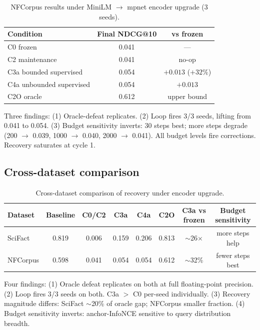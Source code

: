 \documentclass[12pt]{article}
\begin{document}
\begin{table}[ht]
\centering
\caption{NFCorpus results under MiniLM $\to$ mpnet encoder upgrade (3 seeds).}
\label{tab:nfcorpus}
\begin{tabular}{lcc}
\toprule
\textbf{Condition} & \textbf{Final NDCG@10} & \textbf{vs frozen} \\
\midrule
C0 frozen & 0.041 & --- \\
C2 maintenance & 0.041 & no-op \\
C3a bounded supervised & 0.054 & $+0.013$ ($+32\%$) \\
C4a unbounded supervised & 0.054 & $+0.013$ \\
C2O oracle & 0.612 & upper bound \\
\bottomrule
\end{tabular}
\end{table}

Three findings: (1) Oracle-defeat replicates. (2) Loop fires 3/3 seeds, lifting from 0.041 to 0.054. (3) Budget sensitivity inverts: 30 steps best; more steps degrade (200 $\to$ 0.039, 1000 $\to$ 0.040, 2000 $\to$ 0.041). All budget levels fire corrections. Recovery saturates at cycle 1.

\subsection{Cross-dataset comparison}
\label{sec:cross-dataset}

\begin{table}[ht]
\centering
\caption{Cross-dataset comparison of recovery under encoder upgrade.}
\label{tab:cross}
\begin{tabular}{lccccccc}
\toprule
\textbf{Dataset} & \textbf{Baseline} & \textbf{C0/C2} & \textbf{C3a} & \textbf{C4a} & \textbf{C2O} & \textbf{C3a vs frozen} & \textbf{Budget sensitivity} \\
\midrule
SciFact & 0.819 & 0.006 & 0.159 & 0.206 & 0.813 & $\sim$26$\times$ & more steps help \\
NFCorpus & 0.598 & 0.041 & 0.054 & 0.054 & 0.612 & $\sim$32\% & fewer steps best \\
\bottomrule
\end{tabular}
\end{table}

Four findings: (1) Oracle defeat replicates on both at full floating-point precision. (2) Loop fires 3/3 seeds on both. C3a $>$ C0 per-seed individually. (3) Recovery magnitude differs: SciFact $\sim$20\% of oracle gap; NFCorpus smaller fraction. (4) Budget sensitivity inverts: anchor-InfoNCE sensitive to query distribution breadth.
\end{document}
